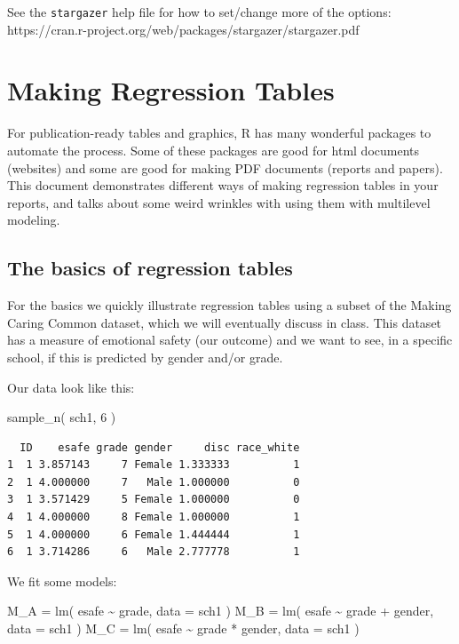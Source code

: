 \documentclass[
  letterpaper,
  DIV=11,
  numbers=noendperiod]{scrreprt}
\newenvironment{Shaded}{}{}
\newcommand{\AttributeTok}[1]{\textcolor[rgb]{0.49,0.56,0.16}{#1}}
\newcommand{\DecValTok}[1]{\textcolor[rgb]{0.25,0.63,0.44}{#1}}
\newcommand{\FunctionTok}[1]{\textcolor[rgb]{0.02,0.16,0.49}{#1}}
\newcommand{\NormalTok}[1]{#1}
\newcommand{\OtherTok}[1]{\textcolor[rgb]{0.00,0.44,0.13}{#1}}
\newcommand{\SpecialCharTok}[1]{\textcolor[rgb]{0.25,0.44,0.63}{#1}}
\begin{document}
See the \texttt{stargazer} help file for how to set/change more of the
options: https://cran.r-project.org/web/packages/stargazer/stargazer.pdf

\chapter{Making Regression Tables}\label{sec-make-regression-tables}

For publication-ready tables and graphics, R has many wonderful packages
to automate the process. Some of these packages are good for html
documents (websites) and some are good for making PDF documents (reports
and papers). This document demonstrates different ways of making
regression tables in your reports, and talks about some weird wrinkles
with using them with multilevel modeling.

\section{The basics of regression
tables}\label{the-basics-of-regression-tables}

For the basics we quickly illustrate regression tables using a subset of
the Making Caring Common dataset, which we will eventually discuss in
class. This dataset has a measure of emotional safety (our outcome) and
we want to see, in a specific school, if this is predicted by gender
and/or grade.

Our data look like this:

\begin{Shaded}
\begin{Highlighting}[]
\FunctionTok{sample\_n}\NormalTok{( sch1, }\DecValTok{6}\NormalTok{ )}
\end{Highlighting}
\end{Shaded}

\begin{verbatim}
  ID    esafe grade gender     disc race_white
1  1 3.857143     7 Female 1.333333          1
2  1 4.000000     7   Male 1.000000          0
3  1 3.571429     5 Female 1.000000          0
4  1 4.000000     8 Female 1.000000          1
5  1 4.000000     6 Female 1.444444          1
6  1 3.714286     6   Male 2.777778          1
\end{verbatim}

We fit some models:

\begin{Shaded}
\begin{Highlighting}[]
\NormalTok{M\_A }\OtherTok{=} \FunctionTok{lm}\NormalTok{( esafe }\SpecialCharTok{\textasciitilde{}}\NormalTok{ grade, }\AttributeTok{data =}\NormalTok{ sch1 )}
\NormalTok{M\_B }\OtherTok{=} \FunctionTok{lm}\NormalTok{( esafe }\SpecialCharTok{\textasciitilde{}}\NormalTok{ grade }\SpecialCharTok{+}\NormalTok{ gender, }\AttributeTok{data =}\NormalTok{ sch1 )}
\NormalTok{M\_C }\OtherTok{=} \FunctionTok{lm}\NormalTok{( esafe }\SpecialCharTok{\textasciitilde{}}\NormalTok{ grade }\SpecialCharTok{*}\NormalTok{ gender, }\AttributeTok{data =}\NormalTok{ sch1 )}
\end{Highlighting}
\end{Shaded}
\end{document}
